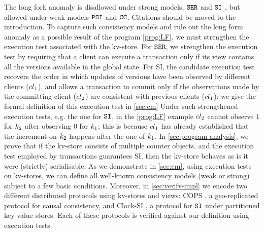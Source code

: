 The long fork anomaly is disallowed under strong models, \eg \(\mathtt{SER}\) and 
\(\mathtt{SI}\) \cite{fekete-tods}, 
but allowed under weak models \eg \(\mathtt{PSI}\) \cite{PSI} and \(\mathtt{CC}\). 
\ac{Citations should be moved to the introduction.}
To capture such consistency models and rule out the long form anomaly as a possible result 
of the program \eqref{prog:LF}, we must strengthen the execution test associated with the kv-store. 
For \(\mathtt{SER}\), we strengthen the execution test by requiring that a client can execute a transaction 
only if its view contains all the versions available in the global state. 
For SI, 
the candidate execution test recovers the order in which 
updates of versions have been observed by different clients (\eg ${cl}_1$), 
and allows a transaction to commit only if the observations made by the committing client (\eg ${cl}_2$) 
are consistent with previous clients (\ie ${cl}_1$): we give the formal definition of this execution test 
in \cref{sec:cm}
Under such strengthened execution tests, e.g. the one for \(\mathtt{SI}\), in the \eqref{prog:LF} example ${cl}_2$ cannot
observe $1$ for $k_2$ after observing $0$ for $k_1$; 
this is because ${cl}_1$ has already established that the increment on $k_2$ happens after 
the one of $k_1$. 
In \cref{sec:program-analysis}, we prove that if the kv-store consists of multiple counter objects, and the execution test employed by transactions guarantees SI, then the kv-store 
behaves as is it were (strictly) serialisable.
As we demonstrate in \cref{sec:cm}, using execution tests on kv-stores, we can define all well-known consistency models (weak or strong) subject to a few basic conditions. 
Moreover, in \cref{sec:verify-impl} we encode two different distributed protocols using kv-stores and views: COPS \cite{cops}, 
a geo-replicated protocol for causal consistency, and Clock-SI \cite{clocksi}, a protocol for \(\mathtt{SI}\) under partitioned key-value stores.
Each of these protocols is verified against our definition using execution tests.
